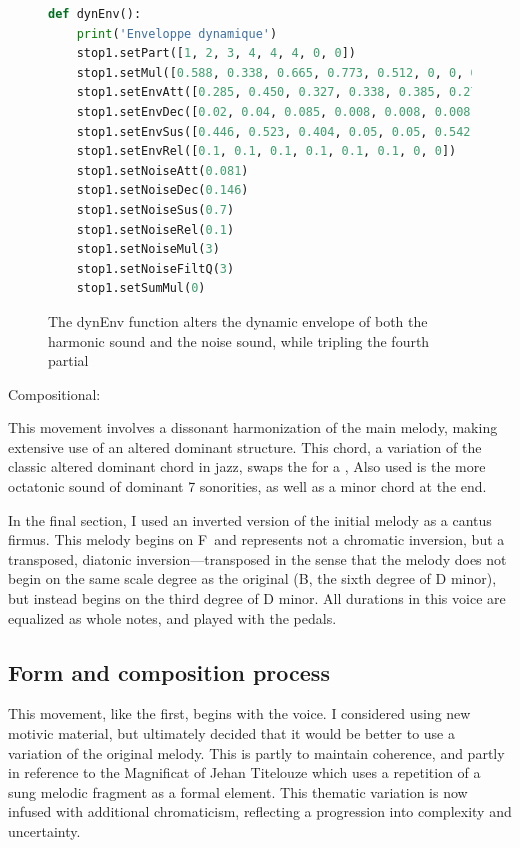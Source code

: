 \documentclass[12pt,twoside,maitrise]{dms_ks}
\theoremstyle{definition}
\begin{document}
{\begin{figure}[H]
\begin{lstlisting}[language=Python]
def dynEnv():
    print('Enveloppe dynamique')
    stop1.setPart([1, 2, 3, 4, 4, 4, 0, 0])
    stop1.setMul([0.588, 0.338, 0.665, 0.773, 0.512, 0, 0, 0])
    stop1.setEnvAtt([0.285, 0.450, 0.327, 0.338, 0.385, 0.277, 0, 0])
    stop1.setEnvDec([0.02, 0.04, 0.085, 0.008, 0.008, 0.008, 0, 0])
    stop1.setEnvSus([0.446, 0.523, 0.404, 0.05, 0.05, 0.542, 0, 0])
    stop1.setEnvRel([0.1, 0.1, 0.1, 0.1, 0.1, 0.1, 0, 0])
    stop1.setNoiseAtt(0.081)
    stop1.setNoiseDec(0.146)
    stop1.setNoiseSus(0.7)
    stop1.setNoiseRel(0.1)
    stop1.setNoiseMul(3)
    stop1.setNoiseFiltQ(3)
    stop1.setSumMul(0)
\end{lstlisting}
\caption{The dynEnv function alters the dynamic envelope of both the harmonic sound and the noise sound, while tripling the fourth partial}
\end{figure}

Compositional:

This movement involves a dissonant harmonization of the main melody, making extensive use of an altered dominant  structure.
This chord, a variation of the classic altered dominant chord in jazz, swaps the  for a , 
Also used is the more octatonic sound of dominant 7   sonorities, as well as a minor  chord at the end.

In the final section, I used an inverted version of the initial melody as a cantus firmus.
This melody begins on F\na\ and represents not a chromatic inversion, but a transposed, diatonic inversion---transposed in the sense that the melody does not begin on the same scale degree as the original (B\fl, the sixth degree of D minor), but instead begins on the third degree of D minor. 
All durations in this voice are equalized as whole notes, and played with the pedals.

\subsection{Form and composition process}

This movement, like the first, begins with the voice.
I considered using new motivic material, but ultimately decided that it would be better to use a variation of the original melody.
This is partly to maintain coherence, and partly in reference to the Magnificat of Jehan Titelouze which uses a repetition of a sung melodic fragment as a formal element.
This thematic variation is now infused with additional chromaticism, reflecting a progression into complexity and uncertainty.

}
\end{document}
